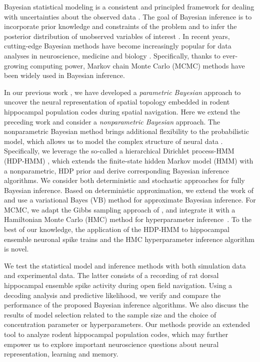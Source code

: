 Bayesian statistical modeling is a consistent and principled  framework for dealing with uncertainties 
about the observed data \citep{Scott02}.  
The goal of Bayesian inference is to incorporate prior knowledge and constraints
of the problem and to infer the posterior distribution of  unobserved variables of interest \citep{Gelman13}. In recent years, cutting-edge Bayesian methods have become increasingly popular
for data analyses in neuroscience, medicine and biology \citep{Mishchenko11a,Chen11,Chen13,Davidson09,Kloosterman14,Yau11}. Specifically, thanks to ever-growing computing power, Markov chain Monte Carlo (MCMC) methods have been widely used in Bayesian inference. 


In our previous work \citep{Chen12a,Chen14}, we have developed a {\em parametric Bayesian} approach to uncover the neural 
representation of spatial topology embedded in rodent hippocampal population codes during spatial navigation. 
Here we extend the preceding work and consider a {\em nonparametric Bayesian} 
approach. 
The nonparametric Bayesian method brings additional flexibility to the probabilistic model, which allows us 
to model the complex structure of neural data \citep{Teh10,Wood08,Shalchyan14}.  
Specifically, we leverage the so-called a hierarchical Dirichlet process-HMM (HDP-HMM) \citep{Teh06}, which extends the finite-state hidden Markov model (HMM) with a nonparametric, HDP prior and derive corresponding Bayesian inference algorithms. 
We consider both deterministic and stochastic approaches for fully Bayesian inference. 
Based on deterministic approximation, we extend the work of \citep{Chen12a,Johnson14} and use a variational Bayes (VB) method for approximate Bayesian inference.  For MCMC, we adapt the Gibbs sampling approach of \citep{Teh06}, and integrate it with a Hamiltonian  Monte Carlo (HMC) method for hyperparameter inference~\citep{Neal10}. 
To the best of our knowledge, the application of the HDP-HMM to hippocampal ensemble neuronal spike trains and the HMC hyperparameter inference algorithm is novel. 

 
We test the statistical model and inference methods with  both simulation data and experimental data. The latter consists of a recording of rat dorsal hippocampal ensemble spike activity during  open field navigation. Using a decoding analysis and predictive likelihood, we verify and  compare the performance of the proposed Bayesian inference algorithms. We also discuss the results of model selection related to the sample size and the choice of concentration parameter or hyperparameters. Our methods provide an extended tool to analyze rodent hippocampal population codes, which may further empower us to explore important neuroscience questions about neural representation, learning and memory. 
 

